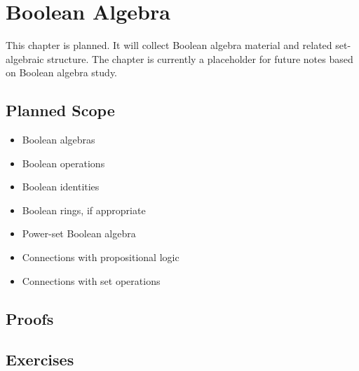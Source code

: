 \chapter{Boolean Algebra}

\begin{tcolorbox}[
  colback=gray!6,
  colframe=gray!40,
  arc=2pt,
  left=8pt, right=8pt, top=6pt, bottom=6pt,
  title={\small\textbf{Chapter Status}},
  fonttitle=\small\bfseries
]
This chapter is planned. It will collect Boolean algebra material and related
set-algebraic structure. The chapter is currently a placeholder for future
notes based on Boolean algebra study.
\end{tcolorbox}

\section*{Planned Scope}

\begin{itemize}
  \item Boolean algebras
  \item Boolean operations
  \item Boolean identities
  \item Boolean rings, if appropriate
  \item Power-set Boolean algebra
  \item Connections with propositional logic
  \item Connections with set operations
\end{itemize}



\clearpage
\section*{Proofs}

\clearpage
\section*{Exercises}

